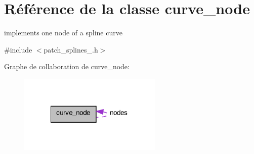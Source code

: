 \hypertarget{classcurve__node}{\section{Référence de la classe curve\+\_\+node}
\label{classcurve__node}
}


implements one node of a spline curve  




{\ttfamily \#include $<$patch\+\_\+splines\+\_.\+h$>$}



Graphe de collaboration de curve\+\_\+node\+:\nopagebreak
\begin{figure}[H]
\begin{center}
\leavevmode
\includegraphics[width=194pt]{classcurve__node__coll__graph}
\end{center}
\end{figure}
